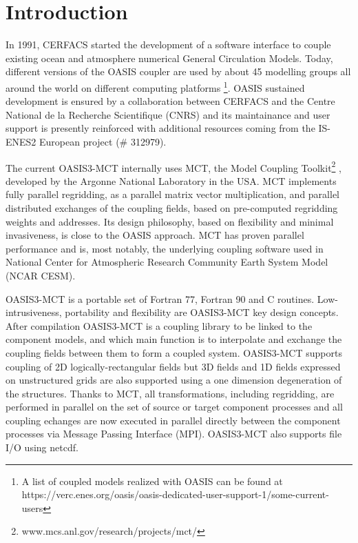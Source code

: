 \newpage
\chapter{Introduction}
\label{sec_step}

In 1991, CERFACS started the development of
a software interface to couple existing ocean and atmosphere numerical General
Circulation Models. Today, different versions of the 
OASIS coupler are used by about 45 modelling groups all around the
world on different computing platforms \citep{valcke8}\footnote{A list of
coupled models realized with OASIS can be found at https://verc.enes.org/oasis/oasis-dedicated-user-support-1/some-current-users}.
OASIS sustained development is ensured by a collaboration
between CERFACS and the Centre National de la Recherche Scientifique
(CNRS) and its maintainance and user support is presently reinforced
with additional resources coming from the IS-ENES2 European project (\# 312979).

The current OASIS3-MCT internally uses MCT, the Model
Coupling Toolkit\footnote{www.mcs.anl.gov/research/projects/mct/} \citep{mct_larson} \newline \citep{mct_jacob}, developed by the Argonne National Laboratory in the USA. MCT implements fully parallel regridding, as a parallel matrix vector 
multiplication, and parallel distributed exchanges of the coupling
fields, based on pre-computed regridding weights and addresses. 
Its design philosophy, based on flexibility and minimal invasiveness,
is close to the OASIS approach. 
MCT has proven parallel performance and is, most notably, the
underlying coupling software used in National Center for Atmospheric
Research Community Earth System Model (NCAR CESM).

OASIS3-MCT is a portable set of Fortran 77, Fortran 90 and C
routines. Low-intrusiveness, portability and flexibility are
OASIS3-MCT key design concepts. After compilation OASIS3-MCT is a
coupling library to be linked to the component models, and which main
function is to interpolate and exchange the coupling fields between
them to form a coupled system.  OASIS3-MCT supports  coupling of 2D
logically-rectangular fields but 3D fields and 1D fields expressed on
unstructured grids are also supported using a one dimension
degeneration of the structures. Thanks to MCT, all transformations,
including regridding, are performed in parallel on the set of source or
target component processes and all coupling echanges are now executed
in parallel directly between the component processes via Message Passing Interface
(MPI). OASIS3-MCT also supports file I/O using netcdf. 

